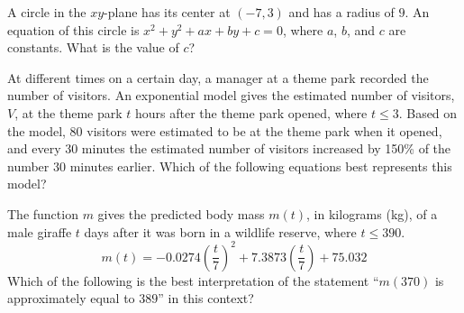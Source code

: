 \vspace{0.75em}


\vspace{2em}
\newpage

\noindent\markforreview
\vspace{1em}

A circle in the $xy$-plane has its center at $(-7, 3)$ and has a radius of $9$.  
An equation of this circle is $x^2 + y^2 + ax + by + c = 0$, where $a$, $b$, and $c$ are constants.  
What is the value of $c$?

\vspace{2em}
\newpage

\noindent\markforreview
\vspace{1em}

At different times on a certain day, a manager at a theme park recorded the number of visitors.  
An exponential model gives the estimated number of visitors, $V$, at the theme park $t$ hours after the theme park opened, where $t \leq 3$.  
Based on the model, 80 visitors were estimated to be at the theme park when it opened,  
and every 30 minutes the estimated number of visitors increased by 150\% of the number 30 minutes earlier.  
Which of the following equations best represents this model?

\vspace{0.75em}


\vspace{2em}
\newpage

\noindent\markforreview
\vspace{1em}

The function $m$ gives the predicted body mass $m(t)$, in kilograms (kg), of a male giraffe $t$ days after it was born in a wildlife reserve, where $t \leq 390$.  
\[
m(t) = -0.0274\left(\frac{t}{7}\right)^2 + 7.3873\left(\frac{t}{7}\right) + 75.032
\]  
Which of the following is the best interpretation of the statement “$m(370)$ is approximately equal to $389$” in this context?

\vspace{0.75em}


